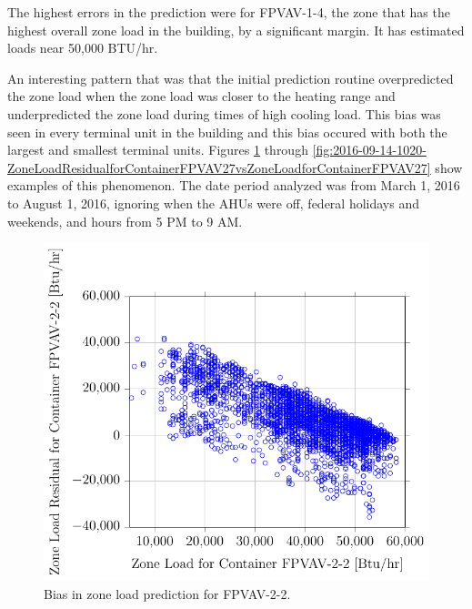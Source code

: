The highest errors in the prediction were for FPVAV-1-4, the zone that
has the highest overall zone load in the building, by a significant
margin. It has estimated loads near 50,000 BTU/hr.



An interesting pattern that was that the initial prediction routine
overpredicted the zone load when the zone load was closer to the heating
range and underpredicted the zone load during times of high cooling
load. This bias was seen in every terminal unit in the building and this
bias occured with both the largest and smallest terminal units. Figures
\ref{fig:2016-09-14-1028-ZoneLoadResidualforContainerFPVAV22vsZoneLoadforContainerFPVAV22}
through
\ref{fig:2016-09-14-1020-ZoneLoadResidualforContainerFPVAV27vsZoneLoadforContainerFPVAV27}
show examples of this phenomenon. The date period analyzed was from
March 1, 2016 to August 1, 2016, ignoring when the AHUs were off,
federal holidays and weekends, and hours from 5 PM to 9 AM. 

\newcommand{\zoneLoadCaption}[1]{Bias in zone load prediction for #1.}

\begin{figure}
\centering
\includegraphics[]{Plots/2016-09-14-1028-ZoneLoadResidualforContainerFPVAV22vsZoneLoadforContainerFPVAV22.pdf}
\caption{\zoneLoadCaption{FPVAV-2-2}}
\label{fig:2016-09-14-1028-ZoneLoadResidualforContainerFPVAV22vsZoneLoadforContainerFPVAV22}
\end{figure}

